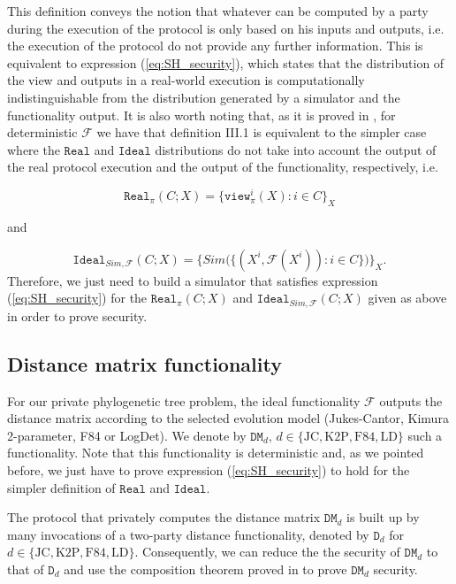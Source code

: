 This definition conveys the notion that whatever can be computed by a party during the execution of the protocol is only based on his inputs and outputs, i.e. the execution of the protocol do not provide any further information. This is equivalent to expression (\ref{eq:SH_security}), which states that the distribution of the view and outputs in a real-world execution is computationally indistinguishable from the distribution generated by a simulator and the functionality output. It is also worth noting that, as it is proved in \cite{Lindell2017}, for deterministic $\mathcal{F}$ we have that definition III.1 is equivalent to the simpler case where the $\mathtt{Real}$ and $\mathtt{Ideal}$ distributions do not take into account the output of the real protocol execution and the output of the functionality, respectively, i.e.

$$\mathtt{Real}_\pi(C; X) = \{ \mathtt{view}^i_\pi(X) : i\in C \}_X$$

and

$$\mathtt{Ideal}_{Sim, \mathcal{F}}(C; X) = \big\{ Sim\big(\{(X^i, \mathcal{F}(X^i)) : i\in C \}\big) \big\}_{X}.$$
Therefore, we just need to build a simulator that satisfies expression (\ref{eq:SH_security}) for the $\mathtt{Real}_\pi(C; X)$ and $\mathtt{Ideal}_{Sim, \mathcal{F}}(C; X)$ given as above in order to prove security.

\subsection{Distance matrix functionality}

For our private phylogenetic tree problem, the ideal functionality $\mathcal{F}$ outputs the distance matrix according to the selected evolution model (Jukes-Cantor, Kimura 2-parameter, F84 or LogDet). We denote by $\mathtt{DM}_{d},\, d\in\{\text{JC}, \text{K2P}, \text{F84}, \text{LD}\}$ such a functionality. Note that this functionality is deterministic and, as we pointed before, we just have to prove expression (\ref{eq:SH_security}) to hold for the simpler definition of $\mathtt{Real}$ and $\mathtt{Ideal}$.

The protocol that privately computes the distance matrix $\mathtt{DM}_{d}$ is built up by many invocations of a two-party distance functionality, denoted by $\mathtt{D}_d$ for $d\in\{\text{JC}, \text{K2P}, \text{F84}, \text{LD}\}$. Consequently, we can reduce the the security of $\mathtt{DM}_{d}$ to that of $\mathtt{D}_d$ and use the composition theorem proved in \cite{Goldreich98} %
to prove $\mathtt{DM}_{d}$ security. 

